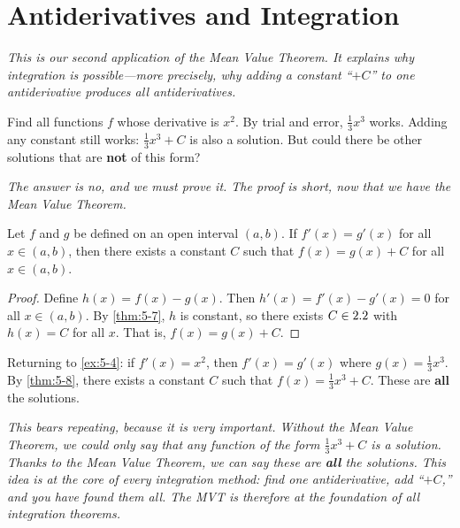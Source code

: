 \section{Antiderivatives and Integration}
\label{sec:5.10}

\textit{This is our second application of the Mean Value Theorem.  It explains why integration is possible---more precisely, why adding a constant ``$+ C$'' to one antiderivative produces \emph{all} antiderivatives.}

\begin{example}
\label{ex:5-4}
Find all functions $f$ whose derivative is $x^{2}$.  By trial and error, $\frac{1}{3}x^{3}$ works.  Adding any constant still works: $\frac{1}{3}x^{3} + C$ is also a solution.  But could there be other solutions that are \textbf{not} of this form?
\end{example}

\textit{The answer is no, and we must prove it.  The proof is short, now that we have the Mean Value Theorem.}

\begin{corollary}
\label{thm:5-8}
Let $f$ and $g$ be defined on an open interval $(a,b)$.  If $f'(x) = g'(x)$ for all $x \in (a,b)$, then there exists a constant $C$ such that $f(x) = g(x) + C$ for all $x \in (a,b)$.
\end{corollary}

\begin{proof}
Define $h(x) = f(x) - g(x)$.  Then $h'(x) = f'(x) - g'(x) = 0$ for all $x \in (a,b)$.  By \cref{thm:5-7}, $h$ is constant, so there exists $C \in 2.2$ with $h(x) = C$ for all $x$.  That is, $f(x) = g(x) + C$.
\end{proof}

\begin{remark}
Returning to \cref{ex:5-4}: if $f'(x) = x^{2}$, then $f'(x) = g'(x)$ where $g(x) = \frac{1}{3}x^{3}$.  By \cref{thm:5-8}, there exists a constant $C$ such that $f(x) = \frac{1}{3}x^{3} + C$.  These are \textbf{all} the solutions.
\end{remark}

\textit{This bears repeating, because it is very important.  Without the Mean Value Theorem, we could only say that any function of the form $\frac{1}{3}x^{3} + C$ is \emph{a} solution.  Thanks to the Mean Value Theorem, we can say these are \textbf{all} the solutions.  This idea is at the core of every integration method: find one antiderivative, add ``$+ C$,'' and you have found them all.  The MVT is therefore at the foundation of all integration theorems.}

